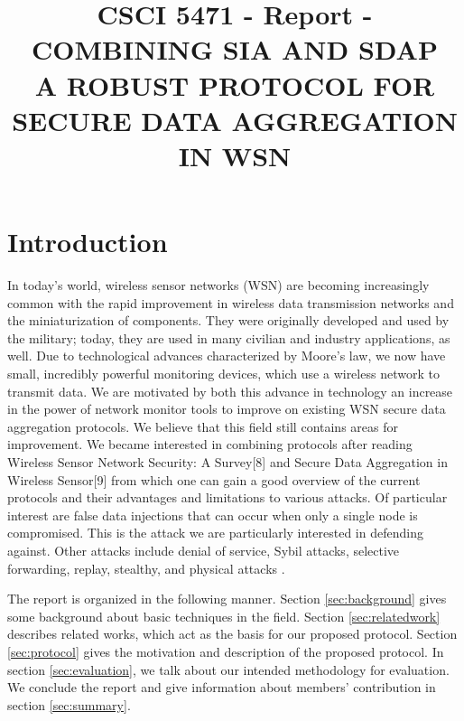 \documentclass[a4paper]{article}
\title{CSCI 5471 - Report - COMBINING SIA AND SDAP \\
A ROBUST PROTOCOL FOR SECURE DATA AGGREGATION IN WSN}
\begin{document}
%
\maketitle

%



%
\section{Introduction}
\label{sec:intro}

In today's world, wireless sensor networks (WSN) are becoming increasingly
common with the rapid improvement in wireless data transmission networks and
the miniaturization of components. They were originally developed and used by
the military; today, they are used in many civilian and industry applications,
as well. Due to technological advances characterized by Moore's law, we now
have small, incredibly powerful monitoring devices, which use a wireless
network to transmit data. We are motivated by both this advance in technology
an increase in the power of network monitor tools to improve on existing WSN
secure data aggregation protocols. We believe that this field still contains
areas for improvement. We became interested in combining protocols after
reading Wireless Sensor Network Security: A Survey[8] and Secure Data
Aggregation in Wireless Sensor[9] from which one can gain a good overview of
the current protocols and their advantages and limitations to various
attacks. Of particular interest are false data injections that can occur when
only a single node is compromised. This is the attack we are particularly
interested in defending against. Other attacks include denial of service,
Sybil attacks, selective forwarding, replay, stealthy, and physical attacks
\cite{Alzaid08}.

The report is organized in the following manner. Section \ref{sec:background}
gives some background about basic techniques in the field. Section 
\ref{sec:relatedwork} describes related works, which act as the basis
for our proposed protocol. Section \ref{sec:protocol} gives
the motivation and description of the proposed protocol. In section
\ref{sec:evaluation}, we talk about our intended methodology
for evaluation. We conclude the report and give information
about members' contribution in section \ref{sec:summary}.
\end{document}
